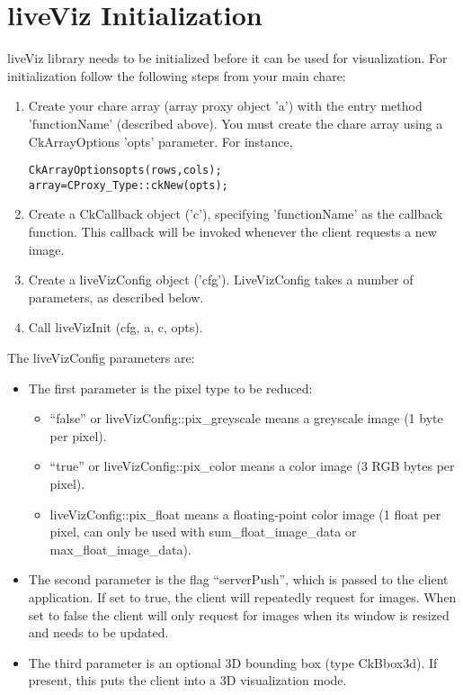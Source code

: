 \section{liveViz Initialization}

liveViz library needs to be initialized before it can be used for 
visualization. For initialization follow the following steps
from your main chare:

\begin{enumerate}
\item Create your chare array (array proxy object 'a') with the entry 
      method 'functionName' (described above). You must create the chare array
      using a CkArrayOptions 'opts' parameter. For instance,
\begin{alltt}
	CkArrayOptions opts(rows, cols);
	array = CProxy_Type::ckNew(opts);
\end{alltt}
\item Create a CkCallback object ('c'), specifying 'functionName' as the 
      callback function.  This callback will be invoked whenever the
      client requests a new image.
\item Create a liveVizConfig object ('cfg').  LiveVizConfig takes a number
     of parameters, as described below.
\item Call liveVizInit (cfg, a, c, opts).
\end{enumerate}

The liveVizConfig parameters are:
\begin{itemize}
  \item The first parameter is the pixel type to be reduced:
     \begin{itemize}
       \item ``false'' or liveVizConfig::pix\_greyscale means a greyscale image (1 byte per pixel).
       \item ``true'' or liveVizConfig::pix\_color means a color image (3 RGB bytes per pixel).
       \item liveVizConfig::pix\_float means a floating-point color image (1 float per pixel, can only be used with sum\_float\_image\_data or max\_float\_image\_data).
     \end{itemize}
   \item The second parameter is the flag ``serverPush'', which is passed to the client application. If set to true, the client will repeatedly request for images. When set to false the client will only request for images when its window is resized and needs to be updated.     
   \item The third parameter is an optional 3D bounding box (type CkBbox3d).  If present, this puts the client into a 3D visualization mode.
\end{itemize}

